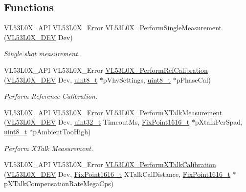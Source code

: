 \subsection*{Functions}
\begin{DoxyCompactItemize}
\item 
V\+L53\+L0\+X\+\_\+\+A\+PI V\+L53\+L0\+X\+\_\+\+Error \hyperlink{group__VL53L0X__measurement__group_gad56ed8d1403da5d203e2418a1f57fa81}{V\+L53\+L0\+X\+\_\+\+Perform\+Single\+Measurement} (\hyperlink{group__VL53L0X__platform__group_ga2d6405308b1dd524b462f1b8fb97d167}{V\+L53\+L0\+X\+\_\+\+D\+EV} Dev)
\begin{DoxyCompactList}\small\item\em Single shot measurement. \end{DoxyCompactList}\item 
V\+L53\+L0\+X\+\_\+\+A\+PI V\+L53\+L0\+X\+\_\+\+Error \hyperlink{group__VL53L0X__measurement__group_gafaf70e8668f8c650875a8f3a54366a20}{V\+L53\+L0\+X\+\_\+\+Perform\+Ref\+Calibration} (\hyperlink{group__VL53L0X__platform__group_ga2d6405308b1dd524b462f1b8fb97d167}{V\+L53\+L0\+X\+\_\+\+D\+EV} Dev, \hyperlink{vl53l0x__types_8h_aba7bc1797add20fe3efdf37ced1182c5}{uint8\+\_\+t} $\ast$p\+Vhv\+Settings, \hyperlink{vl53l0x__types_8h_aba7bc1797add20fe3efdf37ced1182c5}{uint8\+\_\+t} $\ast$p\+Phase\+Cal)
\begin{DoxyCompactList}\small\item\em Perform Reference Calibration. \end{DoxyCompactList}\item 
V\+L53\+L0\+X\+\_\+\+A\+PI V\+L53\+L0\+X\+\_\+\+Error \hyperlink{group__VL53L0X__measurement__group_ga13087ecf932d9d92ba24081b652c066b}{V\+L53\+L0\+X\+\_\+\+Perform\+X\+Talk\+Measurement} (\hyperlink{group__VL53L0X__platform__group_ga2d6405308b1dd524b462f1b8fb97d167}{V\+L53\+L0\+X\+\_\+\+D\+EV} Dev, \hyperlink{vl53l0x__types_8h_a435d1572bf3f880d55459d9805097f62}{uint32\+\_\+t} Timeout\+Ms, \hyperlink{vl53l0x__types_8h_afb910790161809fc76e1a274a6349384}{Fix\+Point1616\+\_\+t} $\ast$p\+Xtalk\+Per\+Spad, \hyperlink{vl53l0x__types_8h_aba7bc1797add20fe3efdf37ced1182c5}{uint8\+\_\+t} $\ast$p\+Ambient\+Too\+High)
\begin{DoxyCompactList}\small\item\em Perform X\+Talk Measurement. \end{DoxyCompactList}\item 
V\+L53\+L0\+X\+\_\+\+A\+PI V\+L53\+L0\+X\+\_\+\+Error \hyperlink{group__VL53L0X__measurement__group_ga5f0f4a2846a8ecf746aa25f738e6b442}{V\+L53\+L0\+X\+\_\+\+Perform\+X\+Talk\+Calibration} (\hyperlink{group__VL53L0X__platform__group_ga2d6405308b1dd524b462f1b8fb97d167}{V\+L53\+L0\+X\+\_\+\+D\+EV} Dev, \hyperlink{vl53l0x__types_8h_afb910790161809fc76e1a274a6349384}{Fix\+Point1616\+\_\+t} X\+Talk\+Cal\+Distance, \hyperlink{vl53l0x__types_8h_afb910790161809fc76e1a274a6349384}{Fix\+Point1616\+\_\+t} $\ast$p\+X\+Talk\+Compensation\+Rate\+Mega\+Cps)

\end{DoxyCompactItemize}
